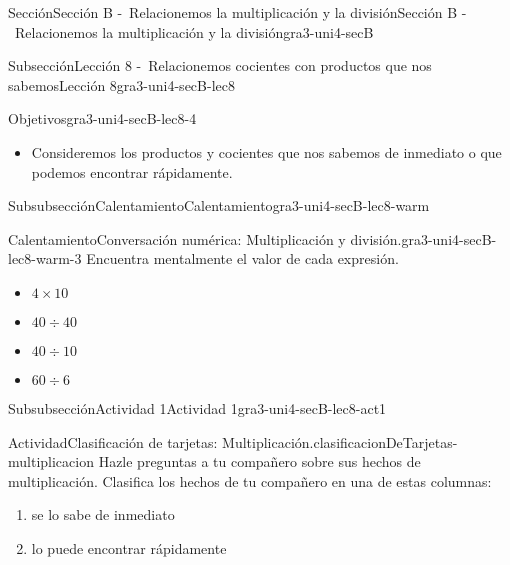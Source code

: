 \documentclass[twoside,10pt,]{article}
\begin{document}
\begin{sectionptx}{Sección}{Sección B -~Relacionemos la multiplicación y la división}{}{Sección B -~Relacionemos la multiplicación y la división}{}{}{gra3-uni4-secB}
\typeout{************************************************}
%
\begin{subsectionptx}{Subsección}{Lección 8 -~Relacionemos cocientes con productos que nos sabemos}{}{Lección 8}{}{}{gra3-uni4-secB-lec8}
\begin{objectives}{Objetivos}{gra3-uni4-secB-lec8-4}
%
\begin{itemize}[label=\textbullet]
\item{}Consideremos los productos y cocientes que nos sabemos de inmediato o que podemos encontrar rápidamente.%
\end{itemize}
\end{objectives}
%
%
\typeout{************************************************}
\typeout{************************************************}
%
\begin{subsubsectionptx}{Subsubsección}{Calentamiento}{}{Calentamiento}{}{}{gra3-uni4-secB-lec8-warm}
\begin{exploration}{Calentamiento}{Conversación numérica: Multiplicación y división.}{gra3-uni4-secB-lec8-warm-3}%
Encuentra mentalmente el valor de cada expresión.%
%
\begin{itemize}[label=\textbullet]
\item{}\(\displaystyle 4\times 10\)%
\item{}\(\displaystyle 40\div 40\)%
\item{}\(\displaystyle 40\div 10\)%
\item{}\(\displaystyle 60\div 6\)%
\end{itemize}
\end{exploration}%
\end{subsubsectionptx}
%
%
\typeout{************************************************}
\typeout{************************************************}
%
\begin{subsubsectionptx}{Subsubsección}{Actividad 1}{}{Actividad 1}{}{}{gra3-uni4-secB-lec8-act1}
\begin{activity}{Actividad}{Clasificación de tarjetas: Multiplicación.}{clasificacionDeTarjetas-multiplicacion}%
Hazle preguntas a tu compañero sobre sus hechos de multiplicación. Clasifica los hechos de tu compañero en una de estas columnas:%
%
\begin{enumerate}
\item{}se lo sabe de inmediato%
\item{}lo puede encontrar rápidamente%

\end{enumerate}
\end{activity}
\end{subsubsectionptx}
\end{subsectionptx}
\end{sectionptx}
\end{document}
